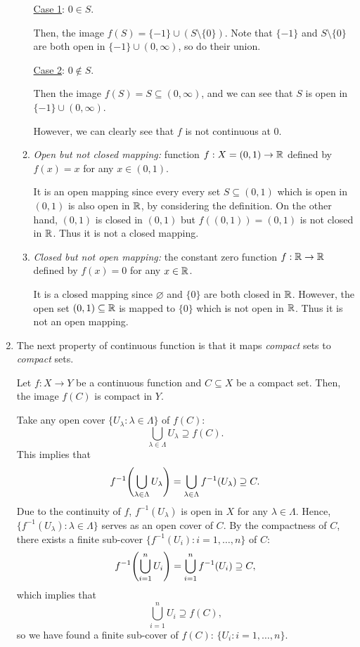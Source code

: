 \begin{enumerate}
\begin{enumerate}
\begin{pf}
\underline{Case 1}: \(0\in S\).

Then, the image \(f(S)=\{-1\}\cup (S\setminus \{0\})\). Note that \(\{-1\}\)
and \(S\setminus \{0\}\) are both open in \(\{-1\}\cup(0,\infty)\), so do their
union.

\underline{Case 2}: \(0\notin S\).

Then the image \(f(S)=S\subseteq (0,\infty)\), and we can see that \(S\) is
open in \(\{-1\}\cup (0,\infty)\).

However, we can clearly see that \(f\) is not continuous at \(0\).
\end{pf}

\item \emph{Open but not closed mapping:} function \(f:X=(0,1)\to\mathbb{R}\)
defined by \(f(x)=x\) for any \(x\in(0,1)\).

\begin{pf}
It is an open mapping since every every set \(S\subseteq (0,1)\) which is open
in \((0,1)\) is also open in \(\mathbb{R}\), by considering the definition. On the
other hand, \((0,1)\) is closed in \((0,1)\) but \(f((0,1))=(0,1)\) is not
closed in \(\mathbb{R}\). Thus it is not a closed mapping.
\end{pf}

\item \emph{Closed but not open mapping:} the constant zero function
\(f:\mathbb{R}\to\mathbb{R}\) defined by \(f(x)=0\) for any \(x\in\mathbb{R}\).

\begin{pf}
It is a closed mapping since \(\varnothing\) and \(\{0\}\) are both closed in
\(\mathbb{R}\). However, the open set \((0,1)\subseteq \mathbb{R}\) is mapped to \(\{0\}\)
which is not open in \(\mathbb{R}\). Thus it is not an open mapping.
\end{pf}
\end{enumerate}

\item The next property of continuous function is that it maps \emph{compact}
sets to \emph{compact} sets.

\begin{theorem}
\label{thm:cts-map-cpt-to-cpt}
Let \(f:X\to Y\) be a continuous function and \(C\subseteq X\) be a compact
set. Then, the image \(f(C)\) is compact in \(Y\).
\end{theorem}
\begin{pf}
Take any open cover \(\{U_{\lambda}:\lambda\in\Lambda\}\) of \(f(C)\):
\[
\bigcup_{\lambda\in\Lambda}U_{\lambda}\supseteq f(C).
\]
This implies that
\[
f^{-1}\qty(\bigcup_{\lambda\in\Lambda}U_{\lambda})=\bigcup_{\lambda\in\Lambda}f^{-1}(U_{\lambda})
\supseteq C.
\]
Due to the continuity of \(f\), \(f^{-1}(U_{\lambda})\) is open in \(X\) for
any \(\lambda\in\Lambda\). Hence, \(\{f^{-1}(U_{\lambda}):\lambda\in\Lambda\}\)
serves as an open cover of \(C\). By the compactness of \(C\), there exists a
finite sub-cover \(\{f^{-1}(U_i):i=1,\dotsc,n\}\) of \(C\):
\[
f^{-1}\qty(\bigcup_{i=1}^{n}U_i)=\bigcup_{i=1}^{n}f^{-1}(U_i)\supseteq C,
\]
which implies that
\[
\bigcup_{i=1}^{n}U_i\supseteq f(C),
\]
so we have found a finite sub-cover of \(f(C)\): \(\{U_i:i=1,\dotsc,n\}\).
\end{pf}


\end{enumerate}
